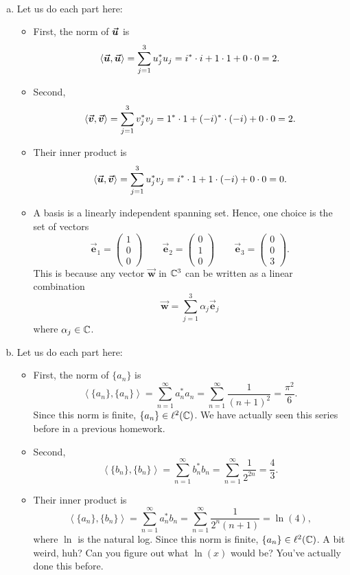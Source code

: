 \documentclass[12pt]{article} %
\newcommand{\innprod}[2]{\left\langle #1, #2\right\rangle}
\newcommand{\blade}[1]{\boldsymbol{\vec{#1}}}
\begin{document}
\begin{solution}~
\begin{enumerate}[(a)]
\item Let us do each part here:
\begin{itemize}
\item First, the norm of $\boldsymbol{\vec{u}}$ is
\[
		\innprod{\vecu}{\vecu} = \sum_{j=1}^3 u_j^* u_j =  i^* \cdot i +1\cdot 1 + 0\cdot 0 = 2.
\]
\item Second, 
\[
		\innprod{\vecv}{\vecv} = \sum_{j=1}^3 v_j^* v_j =  1^* \cdot 1 + (-i)^*\cdot (-i) + 0\cdot 0 = 2.
\]
\item Their inner product is
\[
	\innprod{\vecu}{\vecv} = \sum_{j=1}^3 u_j^* v_j =  i^* \cdot 1 + 1 \cdot (-i) + 0\cdot 0 = 0.
\]

\item A basis is a linearly independent spanning set. Hence, one choice is the set of vectors
\[
\blade{e}_1 = \begin{pmatrix} 1 \\ 0 \\ 0 \end{pmatrix} \qquad \blade{e}_2 = \begin{pmatrix} 0 \\ 1 \\ 0 \end{pmatrix} \qquad \blade{e}_3 = \begin{pmatrix} 0 \\ 0 \\ 3 \end{pmatrix}.
\]
This is because any vector $\blade{w}$ in $\mathbb{C}^3$ can be written as a linear combination
\[
\blade{w} = \sum_{j=1}^3 \alpha_j \blade{e}_j
\]
where $\alpha_j \in \mathbb{C}$.
\end{itemize}
\item Let us do each part here:
\begin{itemize}
\item First, the norm of $\{a_n\}$ is
\[
		\innprod{\{a_n\}}{\{a_n\}} = \sum_{n=1}^\infty a_n^* a_n = \sum_{n=1}^\infty \frac{1}{(n+1)^2} = \frac{\pi^2}{6}.
\]
Since this norm is finite, $\{a_n\} \in \ell^2(\mathbb{C})$. We have actually seen this series before in a previous homework.
\item Second, 
\[
			\innprod{\{b_n\}}{\{b_n\}} = \sum_{n=1}^\infty b_n^* b_n = \sum_{n=1}^\infty \frac{1}{2^{2n}} = \frac{4}{3}.
\]
\item Their inner product is
\[
		\innprod{\{a_n\}}{\{b_n\}} = \sum_{n=1}^\infty a_n^* b_n = \sum_{n=1}^\infty \frac{1}{2^n (n+1)} = \ln(4),
\]
where $\ln$ is the natural log. Since this norm is finite, $\{a_n\} \in \ell^2(\mathbb{C})$. A bit weird, huh? Can you figure out what $\ln(x)$ would be? You've actually done this before.


\end{itemize}
\end{enumerate}
\end{solution}
\end{document}
